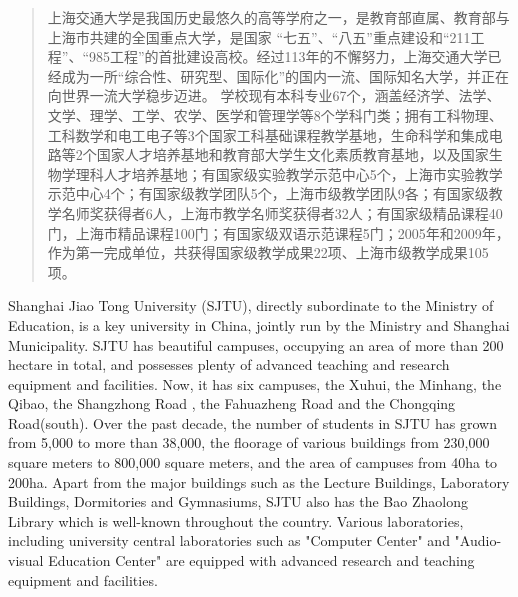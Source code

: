 
\begin{abstract}

  上海交通大学是我国历史最悠久的高等学府之一，是教育部直属、教育部与上海市共建的全国重点大学，是国家 “七五”、“八五”重点建设和“211工程”、“985工程”的首批建设高校。经过113年的不懈努力，上海交通大学已经成为一所“综合性、研究型、国际化”的国内一流、国际知名大学，并正在向世界一流大学稳步迈进。
  学校现有本科专业67个，涵盖经济学、法学、文学、理学、工学、农学、医学和管理学等8个学科门类；拥有工科物理、工科数学和电工电子等3个国家工科基础课程教学基地，生命科学和集成电路等2个国家人才培养基地和教育部大学生文化素质教育基地，以及国家生物学理科人才培养基地；有国家级实验教学示范中心5个，上海市实验教学示范中心4个；有国家级教学团队5个，上海市级教学团队9各；有国家级教学名师奖获得者6人，上海市教学名师奖获得者32人；有国家级精品课程40门，上海市精品课程100门；有国家级双语示范课程5门；2005年和2009年，作为第一完成单位，共获得国家级教学成果22项、上海市级教学成果105项。

\end{abstract}

\begin{englishabstract}

  Shanghai Jiao Tong University (SJTU), directly subordinate to the Ministry of Education, is a key university in China, jointly run by the Ministry and Shanghai Municipality.
  SJTU has beautiful campuses, occupying an area of more than 200 hectare in total, and possesses plenty of advanced teaching and research equipment and facilities. Now, it has six campuses, the Xuhui, the Minhang, the Qibao, the Shangzhong Road , the Fahuazheng Road and the Chongqing Road(south). Over the past decade, the number of students in SJTU has grown from 5,000 to more than 38,000, the floorage of various buildings from 230,000 square meters to 800,000 square meters, and the area of campuses from 40ha to 200ha. Apart from the major buildings such as the Lecture Buildings, Laboratory Buildings, Dormitories and Gymnasiums, SJTU also has the Bao Zhaolong Library which is well-known throughout the country. Various laboratories, including university central laboratories such as "Computer Center" and "Audio-visual Education Center" are equipped with advanced research and teaching equipment and facilities.

\end{englishabstract}
